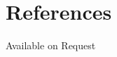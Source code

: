 \documentclass[10pt, a4paper]{article}
\newcommand{\years}[1]{\marginnote{\scriptsize #1}}
\newcommand{\refEntry}[6]{
	\years{#1} 
	\bfseries{#2} \normalfont
	
	\vspace{.2cm}
	 \indent\hspace{.2cm} Job: #3\\
	 \indent\hspace{.2cm} Email: #4,\\
	 \indent\hspace{.2cm} Phone: #5, \\
	 \indent\hspace{.2cm} Address #6
	\normalsize\normalfont\\	  
}
\begin{document}
%		
%		
%		

	\section*{References}
		Available on Request
%		
%				
%			


	
	

		
\end{document}
